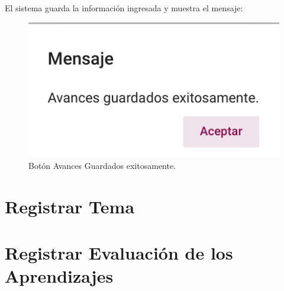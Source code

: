 \documentclass[10pt]{book}
\begin{document}
El sistema guarda la información ingresada y muestra el mensaje: 

\begin{figure}[!hbtp]
    \centering
    \includegraphics[width=0.4\linewidth]{images/SP6/BotonAvance.jpeg}
    \caption{Botón Avances Guardados exitosamente.} 
\end{figure}


\pagebreak

\hypertarget{RegistrarTema}{\section{Registrar Tema}}
\pagebreak
\hypertarget{REA}{\section{Registrar Evaluación de los Aprendizajes}}
\pagebreak
\end{document}
